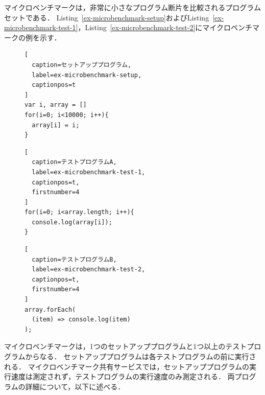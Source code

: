 \documentclass[11pt]{jreport}
\begin{document}
マイクロベンチマークは，非常に小さなプログラム断片を比較されるプログラムセットである．
Listing~\ref{ex-microbenchmark-setup}およびListing~\ref{ex-microbenchmark-test-1}，Listing~\ref{ex-microbenchmark-test-2}にマイクロベンチマークの例を示す．

\begin{figure}[t]
\captionsetup{name=Listing}
\hspace{0.04\columnwidth}
\begin{minipage}[b]{0.96\linewidth}
\begin{lstlisting}[
  caption=セットアッププログラム,
  label=ex-microbenchmark-setup,
  captionpos=t
]
var i, array = []
for(i=0; i<10000; i++){
  array[i] = i;
}
\end{lstlisting}
\end{minipage}

\hspace{0.04\columnwidth}
\begin{minipage}[b]{0.445\linewidth}
\begin{lstlisting}[
  caption=テストプログラムA,
  label=ex-microbenchmark-test-1,
  captionpos=t,
  firstnumber=4
]
for(i=0; i<array.length; i++){
  console.log(array[i]);
}
\end{lstlisting}
\end{minipage}
\hspace{0.059\columnwidth}
\begin{minipage}[b]{0.445\linewidth}
\begin{lstlisting}[
  caption=テストプログラムB,
  label=ex-microbenchmark-test-2,
  captionpos=t,
  firstnumber=4
]
array.forEach(
  (item) => console.log(item)
);
\end{lstlisting}
\end{minipage}
\end{figure}


マイクロベンチマークは，1つのセットアッププログラムと1つ以上のテストプログラムからなる．
セットアッププログラムは各テストプログラムの前に実行される．
マイクロベンチマーク共有サービスでは，セットアッププログラムの実行速度は測定されず，テストプログラムの実行速度のみ測定される．
両プログラムの詳細について，以下に述べる．
\end{document}
